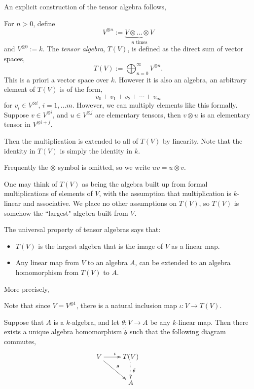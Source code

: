 An explicit construction of the tensor algebra follows,
\begin{definition}
    For $n > 0$, define
    \begin{equation*}
        V^{\otimes n} := \underbrace{V \otimes \ldots \otimes V}_{n\text{ times}}
    \end{equation*}
    and $V^{\otimes 0} := k$. The \emph{tensor algebra}, $T(V)$, is defined as 
    the direct sum of vector spaces,
    \begin{equation*}
        T(V) := \bigoplus_{n=0}^\infty V^{\otimes n}.
    \end{equation*}
    This is a priori a vector space over $k$. However it is also an algebra, an
    arbitrary element of $T(V)$ is of the form,
    \begin{equation*}
        v_0+v_1+v_2+\cdots+v_m
    \end{equation*}
    for $v_i \in V^{\otimes i}$, $i = 1,\ldots m$. However, we can multiply 
    elements like this formally. Suppose $v \in V^{\otimes i}$, and $u \in V^{\otimes j}$
    are elementary tensors, then $v \otimes u$ is an elementary tensor in $V^{\otimes i+j}$.

    Then the multiplication is extended to all of $T(V)$ by linearity.
    Note that the identity in $T(V)$ is simply the identity in $k$.

    Frequently the $\otimes$ symbol is omitted, so we write $uv = u \otimes v$.
\end{definition}

One may think of $T(V)$ as being the algebra built up from
formal multiplications of elements of $V$, with the assumption
that multiplication is $k$-linear and associative. We place no other assumptions on $T(V)$,
so $T(V)$ is somehow the ``largest" algebra built from $V$.

The universal property of tensor algebras says that:
\begin{itemize}
    \item{} $T(V)$ is the largest algebra that is the image of $V$ as a linear map.
    \item{} Any linear map from $V$ to an algebra $A$, can be extended to an algebra homomorphism from $T(V)$ to $A$.
\end{itemize}

More precisely,
\begin{proposition}
    Note that since $V = V^{\otimes 1}$, there is a natural
    inclusion map $\iota: V \rightarrow T(V)$.

    Suppose that $A$ is a $k$-algebra, and let $\theta:V\rightarrow A$
    be any $k$-linear map. Then there exists a unique algebra homomorphism
    $\tilde{\theta}$ such that the following diagram commutes,
    \begin{displaymath}
    \xymatrix{
        V \ar[r]^\iota \ar[rd]^\theta &
        T(V) \ar@{.>}[d]^{\tilde{\theta}} &\\
        &
        A
    }
    \end{displaymath}
\end{proposition}

